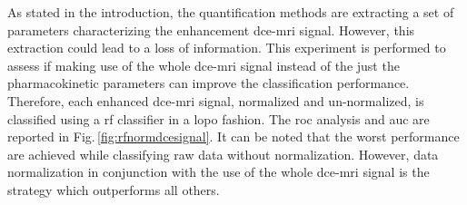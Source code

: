As stated in the introduction, the quantification methods are extracting a set of parameters characterizing the enhancement \ac{dce}-\ac{mri} signal.
However, this extraction could lead to a loss of information.
This experiment is performed to assess if making use of the whole \ac{dce}-\ac{mri} signal instead of the just the pharmacokinetic parameters can improve the classification performance.
Therefore, each enhanced \ac{dce}-\ac{mri} signal, normalized and un-normalized, is classified using a \ac{rf} classifier in a \ac{lopo} fashion.
The \ac{roc} analysis and \ac{auc} are reported in Fig.\,\ref{fig:rfnormdcesignal}.
It can be noted that the worst performance are achieved while classifying raw data without normalization.
However, data normalization in conjunction with the use of the whole \ac{dce}-\ac{mri} signal is the strategy which outperforms all others.

